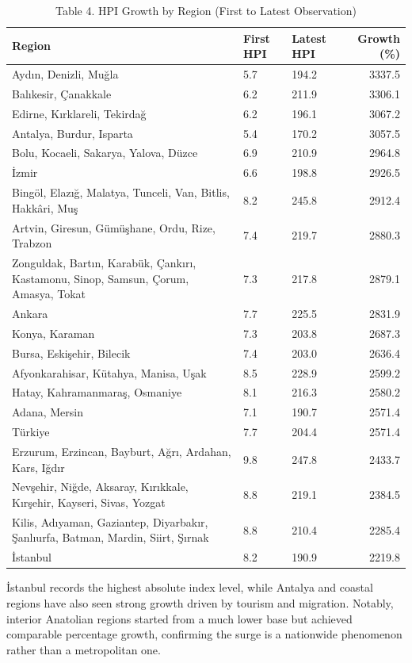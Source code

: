 \documentclass[
  11pt,
  a4paper,
]{article}
\begin{document}
\begin{longtable}[t]{lllr}
\caption{\label{tab:regional-growth-table}Table 4. HPI Growth by Region (First to Latest Observation)}\\
\toprule
Region & First HPI & Latest HPI & Growth (\%)\\
\midrule
Aydın, Denizli, Muğla & 5.7 & 194.2 & 3337.5\\
Balıkesir, Çanakkale & 6.2 & 211.9 & 3306.1\\
Edirne, Kırklareli, Tekirdağ & 6.2 & 196.1 & 3067.2\\
Antalya, Burdur, Isparta & 5.4 & 170.2 & 3057.5\\
Bolu, Kocaeli, Sakarya, Yalova, Düzce & 6.9 & 210.9 & 2964.8\\
\addlinespace
İzmir & 6.6 & 198.8 & 2926.5\\
Bingöl, Elazığ, Malatya, Tunceli, Van, Bitlis, Hakkâri, Muş & 8.2 & 245.8 & 2912.4\\
Artvin, Giresun, Gümüşhane, Ordu, Rize, Trabzon & 7.4 & 219.7 & 2880.3\\
Zonguldak, Bartın, Karabük, Çankırı, Kastamonu, Sinop, Samsun, Çorum, Amasya, Tokat & 7.3 & 217.8 & 2879.1\\
Ankara & 7.7 & 225.5 & 2831.9\\
\addlinespace
Konya, Karaman & 7.3 & 203.8 & 2687.3\\
Bursa, Eskişehir, Bilecik & 7.4 & 203.0 & 2636.4\\
Afyonkarahisar, Kütahya, Manisa, Uşak & 8.5 & 228.9 & 2599.2\\
Hatay, Kahramanmaraş, Osmaniye & 8.1 & 216.3 & 2580.2\\
Adana, Mersin & 7.1 & 190.7 & 2571.4\\
\addlinespace
Türkiye & 7.7 & 204.4 & 2571.4\\
Erzurum, Erzincan, Bayburt, Ağrı, Ardahan, Kars, Iğdır & 9.8 & 247.8 & 2433.7\\
Nevşehir, Niğde, Aksaray, Kırıkkale, Kırşehir, Kayseri, Sivas, Yozgat & 8.8 & 219.1 & 2384.5\\
Kilis, Adıyaman, Gaziantep, Diyarbakır, Şanlıurfa, Batman, Mardin, Siirt, Şırnak & 8.8 & 210.4 & 2285.4\\
İstanbul & 8.2 & 190.9 & 2219.8\\
\bottomrule
\end{longtable}

İstanbul records the highest absolute index level, while Antalya and
coastal regions have also seen strong growth driven by tourism and
migration. Notably, interior Anatolian regions started from a much lower
base but achieved comparable percentage growth, confirming the surge is
a nationwide phenomenon rather than a metropolitan one.
\end{document}
